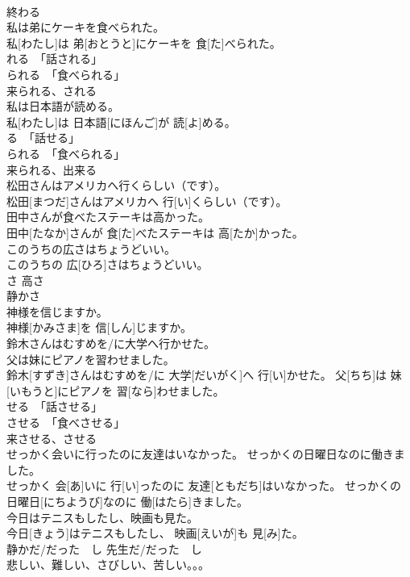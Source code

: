 \documentclass[8pt]{extreport}
\begin{document}
\begin{CJK}{UTF8}{min}
\\	終わる	
\\	私は弟にケーキを食べられた。	
\\	私[わたし]は 弟[おとうと]にケーキを 食[た]べられた。	
\\	れる　「話される」 
\\	られる　「食べられる」 
\\	来られる、される	
\\	私は日本語が読める。	
\\	私[わたし]は 日本語[にほんご]が 読[よ]める。	
\\	る　「話せる」 
\\	られる　「食べられる」 
\\	来られる、出来る	
\\	松田さんはアメリカへ行くらしい（です）。	
\\	松田[まつだ]さんはアメリカへ 行[い]くらしい（です）。	
\\	田中さんが食べたステーキは高かった。	
\\	田中[たなか]さんが 食[た]べたステーキは 高[たか]かった。	
\\	このうちの広さはちょうどいい。	
\\	このうちの 広[ひろ]さはちょうどいい。	
\\	さ 高さ 
\\	静かさ 
\\	神様を信じますか。	
\\	神様[かみさま]を 信[しん]じますか。	
\\	鈴木さんはむすめを/に大学へ行かせた。
\\	父は妹にピアノを習わせました。
\\	鈴木[すずき]さんはむすめを/に 大学[だいがく]へ 行[い]かせた。 父[ちち]は 妹[いもうと]にピアノを 習[なら]わせました。	
\\	せる　「話させる」 
\\	させる　「食べさせる」 
\\	来させる、させる	
\\	せっかく会いに行ったのに友達はいなかった。 せっかくの日曜日なのに働きました。	
\\	せっかく 会[あ]いに 行[い]ったのに 友達[ともだち]はいなかった。 せっかくの 日曜日[にちようび]なのに 働[はたら]きました。	
\\	今日はテニスもしたし、映画も見た。	
\\	今日[きょう]はテニスもしたし、 映画[えいが]も 見[み]た。	
\\	静かだ/だった　し 先生だ/だった　し	
\\	悲しい、難しい、さびしい、苦しい。。。	

\end{CJK}
\end{document}
